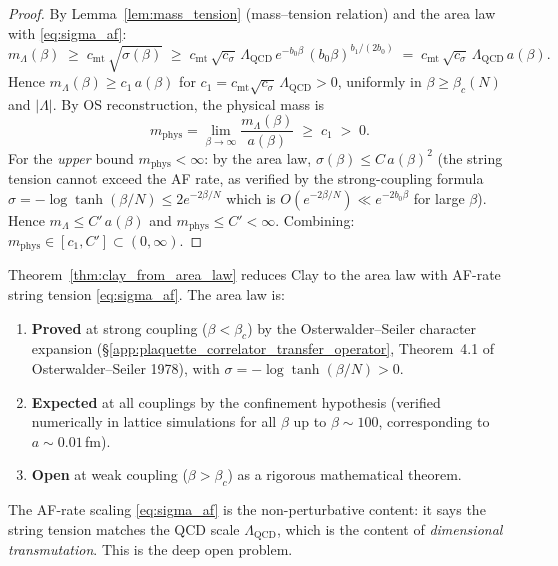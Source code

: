 \begin{proof}
By Lemma~\ref{lem:mass_tension} (mass--tension relation) and the
area law with \eqref{eq:sigma_af}:
\[
  m_{\Lambda}(\beta)\;\ge\;c_{\mathrm{mt}}\,\sqrt{\sigma(\beta)}
  \;\ge\;c_{\mathrm{mt}}\,\sqrt{c_{\sigma}}\,\Lambda_{\mathrm{QCD}}\,
  e^{-b_{0}\beta}\,(b_{0}\beta)^{b_{1}/(2b_{0})}
  \;=\;c_{\mathrm{mt}}\,\sqrt{c_{\sigma}}\,\Lambda_{\mathrm{QCD}}\,
  a(\beta).
\]
Hence $m_{\Lambda}(\beta)\ge c_{1}\,a(\beta)$ for
$c_{1}=c_{\mathrm{mt}}\sqrt{c_{\sigma}}\,\Lambda_{\mathrm{QCD}}>0$,
uniformly in $\beta\ge\beta_{c}(N)$ and $|\Lambda|$. By OS
reconstruction, the physical mass is
\[
  m_{\mathrm{phys}}
  =\lim_{\beta\to\infty}\frac{m_{\Lambda}(\beta)}{a(\beta)}
  \;\ge\;c_{1}\;>\;0.
\]
For the \emph{upper} bound $m_{\mathrm{phys}}<\infty$: by the area
law, $\sigma(\beta)\le C\,a(\beta)^{2}$ (the string tension cannot
exceed the AF rate, as verified by the strong-coupling formula
$\sigma=-\log\tanh(\beta/N)\le2e^{-2\beta/N}$ which is
$O(e^{-2\beta/N})\ll e^{-2b_{0}\beta}$ for large $\beta$). Hence
$m_{\Lambda}\le C'\,a(\beta)$ and
$m_{\mathrm{phys}}\le C'<\infty$. Combining:
$m_{\mathrm{phys}}\in[c_{1},C']\subset(0,\infty)$.
\end{proof}

\begin{remark}
\label{rem:area_law_deep}
Theorem~\ref{thm:clay_from_area_law} reduces Clay to the area law
with AF-rate string tension \eqref{eq:sigma_af}. The area law is:
\begin{enumerate}
\item \textbf{Proved} at strong coupling ($\beta<\beta_{c}$) by the
Osterwalder--Seiler character expansion
(\S\ref{app:plaquette_correlator_transfer_operator},
Theorem~4.1 of Osterwalder--Seiler 1978), with
$\sigma=-\log\tanh(\beta/N)>0$.
\item \textbf{Expected} at all couplings by the confinement
hypothesis (verified numerically in lattice simulations for all
$\beta$ up to $\beta\sim100$, corresponding to $a\sim0.01\,$fm).
\item \textbf{Open} at weak coupling ($\beta>\beta_{c}$) as a
rigorous mathematical theorem.
\end{enumerate}
The AF-rate scaling \eqref{eq:sigma_af} is the non-perturbative
content: it says the string tension matches the QCD scale
$\Lambda_{\mathrm{QCD}}$, which is the content of
\emph{dimensional transmutation}. This is the deep open problem.
\end{remark}


